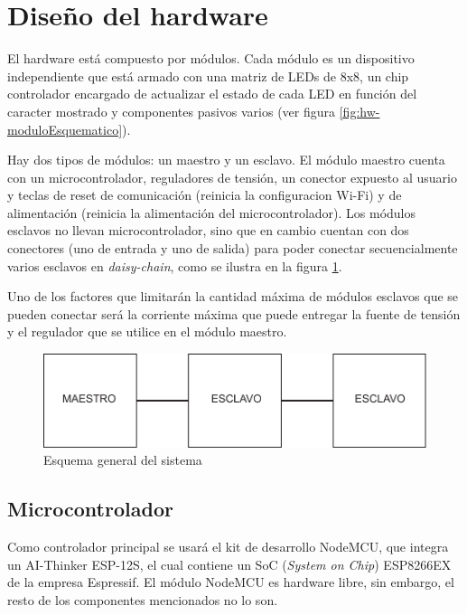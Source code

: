 \section{Diseño del hardware}
El hardware está compuesto por módulos. Cada módulo es un dispositivo independiente que está armado con una matriz de LEDs de 8x8, un chip controlador \cite{MAX7219} encargado de actualizar el estado de cada LED en función del caracter mostrado y componentes pasivos varios (ver figura \ref{fig:hw-moduloEsquematico}). 

Hay dos tipos de módulos: un maestro y un esclavo. El módulo maestro cuenta con un microcontrolador, reguladores de tensión, un conector expuesto al usuario y teclas de reset de comunicación (reinicia la configuracion Wi-Fi) y de alimentación (reinicia la alimentación del microcontrolador). Los módulos esclavos no llevan microcontrolador, sino que en cambio cuentan con dos conectores (uno de entrada y uno de salida) para poder conectar secuencialmente varios esclavos en \emph{daisy-chain}, como se ilustra en la figura \ref{fig:esquema-general}.

Uno de los factores que limitarán la cantidad máxima de módulos esclavos que se pueden conectar será la corriente máxima que puede entregar la fuente de tensión y el regulador que se utilice en el módulo maestro.

\begin{figure}[ht!]
	\begin{center}
		\includegraphics[scale=0.8]{imagenes/hw/esquema-general.pdf}
		\caption{Esquema general del sistema}
		\label{fig:esquema-general}
	\end{center}
\end{figure}

\subsection{Microcontrolador}
Como controlador principal se usará el kit de desarrollo NodeMCU, que integra un AI-Thinker ESP-12S, el cual contiene un SoC (\emph{System on Chip}) ESP8266EX de la empresa Espressif. El módulo NodeMCU es hardware libre, sin embargo, el resto de los componentes mencionados no lo son.\cite{NodeMCU}

